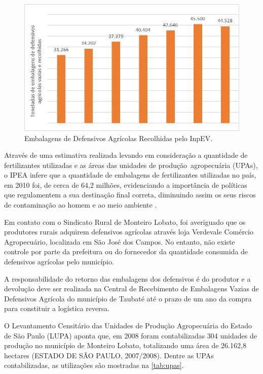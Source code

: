 	\begin{figure}
		\centering
		\includegraphics[width=0.75\linewidth]{produtos/prodtres/image080}
		\caption{Embalagens de Defensivos Agrícolas Recolhidas pelo InpEV.}
		\label{fig:image080}
	\end{figure}
	
	
	Através de uma estimativa realizada levando em consideração a quantidade de fertilizantes utilizadas e as áreas das unidades de produção agropecuária (UPAs), o IPEA infere que a quantidade de embalagens de fertilizantes utilizadas no país, em 2010 foi, de cerca de 64,2 milhões, evidenciando a importância de políticas que regulamentem a sua destinação final correta, diminuindo assim os seus riscos de contaminação ao homem e ao meio ambiente \cite{IPEA2013}.

	Em contato com o Sindicato Rural de Monteiro Lobato, foi averiguado que os produtores rurais adquirem defensivos agrícolas através loja Verdevale Comércio Agropecuário, localizada em São José dos Campos. No entanto, não existe controle por parte da prefeitura ou do fornecedor da quantidade consumida de defensivos agrícolas pelo município. 
	
	A responsabilidade do retorno das embalagens dos defensivos é do produtor e a devolução deve ser realizada na Central de Recebimento de Embalagens Vazias de Defensivos Agrícola do município de Taubaté até o prazo de um ano da compra para constituir a logística reversa.
	
	O Levantamento Censitário das Unidades de Produção Agropecuária do Estado de São Paulo (LUPA) aponta que, em 2008 foram contabilizadas 304 unidades de produção no município de Monteiro Lobato, totalizando uma área de 26.162,8 hectares (ESTADO DE SÃO PAULO, 2007/2008). Dentre as UPAs contabilizadas, as utilizações são mostradas na \autoref{tab:upas}.
	
	


